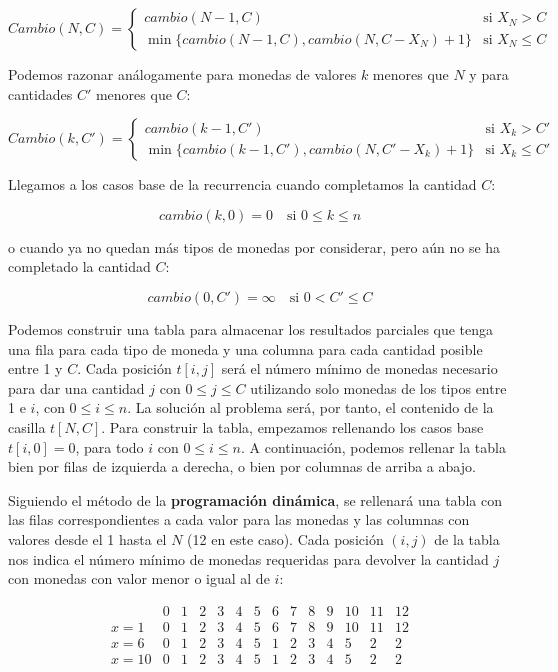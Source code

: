 \[
Cambio(N, C) = 
\begin{cases} 
cambio(N-1, C) & \text{si } X_N > C \\
\min\{cambio(N-1, C), cambio(N, C - X_N) + 1\} & \text{si } X_N \leq C 
\end{cases}
\]

Podemos razonar análogamente para monedas de valores \(k\) menores que \(N\) y para cantidades \(C'\) menores que \(C\):

\[
Cambio(k, C') = 
\begin{cases} 
cambio(k-1, C') & \text{si } X_k > C' \\
\min\{cambio(k-1, C'), cambio(N, C' - X_k) + 1\} & \text{si } X_k \leq C' 
\end{cases}
\]

Llegamos a los casos base de la recurrencia cuando completamos la cantidad \(C\):

\[
cambio(k, 0) = 0 \quad \text{si } 0 \leq k \leq n
\]

o cuando ya no quedan más tipos de monedas por considerar, pero aún no se ha completado la cantidad \(C\):

\[
cambio(0, C') = \infty \quad \text{si } 0 < C' \leq C
\]

Podemos construir una tabla para almacenar los resultados parciales que tenga una fila para cada tipo de moneda y una columna para cada cantidad posible entre 1 y \(C\). Cada posición \(t[i,j]\) será el número mínimo de monedas necesario para dar una cantidad \(j\) con \(0 \leq j \leq C\) utilizando solo monedas de los tipos entre 1 e \(i\), con \(0 \leq i \leq n\). La solución al problema será, por tanto, el contenido de la casilla \(t[N, C]\). Para construir la tabla, empezamos rellenando los casos base \(t[i, 0] = 0\), para todo \(i\) con \(0 \leq i \leq n\). A continuación, podemos rellenar la tabla bien por filas de izquierda a derecha, o bien por columnas de arriba a abajo.

Siguiendo el método de la \textbf{programación dinámica}, se rellenará una tabla con las filas correspondientes a cada valor para las monedas y las columnas con valores desde el 1 hasta el \(N\) (12 en este caso). Cada posición \((i, j)\) de la tabla nos indica el número mínimo de monedas requeridas para devolver la cantidad \(j\) con monedas con valor menor o igual al de \(i\):

\[
\begin{array}{c|ccccccccccccc}
 & 0 & 1 & 2 & 3 & 4 & 5 & 6 & 7 & 8 & 9 & 10 & 11 & 12 \\ \hline
x = 1 & 0 & 1 & 2 & 3 & 4 & 5 & 6 & 7 & 8 & 9 & 10 & 11 & 12 \\
x = 6 & 0 & 1 & 2 & 3 & 4 & 5 & 1 & 2 & 3 & 4 & 5 & 2 & 2 \\
x = 10 & 0 & 1 & 2 & 3 & 4 & 5 & 1 & 2 & 3 & 4 & 5 & 2 & 2 \\
\end{array}
\]

